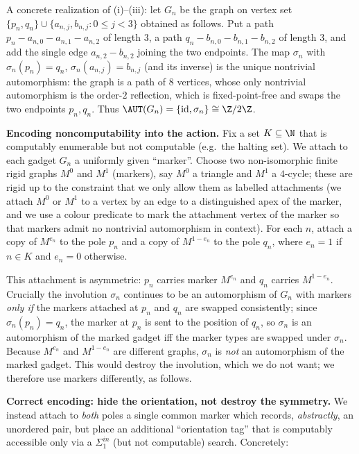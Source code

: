 A concrete realization of (i)--(iii): let $G_n$ be the graph on vertex set
$\{p_n,q_n\}\cup\{a_{n,j},b_{n,j}: 0\le j<3\}$ obtained as follows. Put a path
$p_n - a_{n,0} - a_{n,1} - a_{n,2}$ of length $3$, a path
$q_n - b_{n,0} - b_{n,1} - b_{n,2}$ of length $3$, and add the single edge
$a_{n,2}-b_{n,2}$ joining the two endpoints. The map $\sigma_n$ with
$\sigma_n(p_n)=q_n$, $\sigma_n(a_{n,j})=b_{n,j}$ (and its inverse) is the unique
nontrivial automorphism: the graph is a path of $8$ vertices, whose only nontrivial
automorphism is the order-$2$ reflection, which is fixed-point-free and swaps the
two endpoints $p_n,q_n$. Thus $\AUT(G_n)=\{\mathrm{id},\sigma_n\}\cong\Z/2\Z$.

\medskip

\noindent\textbf{Encoding noncomputability into the action.}
Fix a set $K\subseteq\N$ that is computably enumerable but not computable (e.g.\ the
halting set). We attach to each gadget $G_n$ a uniformly given ``marker''. Choose
two non-isomorphic finite rigid graphs $M^0$ and $M^1$ (markers), say $M^0$ a
triangle and $M^1$ a $4$-cycle; these are rigid up to the constraint that we only
allow them as labelled attachments (we attach $M^0$ or $M^1$ to a vertex by an edge
to a distinguished apex of the marker, and we use a colour predicate to mark the
attachment vertex of the marker so that markers admit no nontrivial automorphism
in context). For each $n$, attach a copy of $M^{e_n}$ to the pole $p_n$ and a copy of
$M^{1-e_n}$ to the pole $q_n$, where $e_n=1$ if $n\in K$ and $e_n=0$ otherwise.

This attachment is asymmetric: $p_n$ carries marker $M^{e_n}$ and $q_n$ carries
$M^{1-e_n}$. Crucially the involution $\sigma_n$ continues to be an automorphism of
$G_n$ with markers \emph{only if} the markers attached at $p_n$ and $q_n$ are
swapped consistently; since $\sigma_n(p_n)=q_n$, the marker at $p_n$ is sent to the
position of $q_n$, so $\sigma_n$ is an automorphism of the marked gadget iff the
marker types are swapped under $\sigma_n$. Because $M^{e_n}$ and $M^{1-e_n}$ are
different graphs, $\sigma_n$ is \emph{not} an automorphism of the marked gadget.
This would destroy the involution, which we do not want; we therefore use markers
differently, as follows.

\medskip

\noindent\textbf{Correct encoding: hide the orientation, not destroy the symmetry.}
We instead attach to \emph{both} poles a single common marker which records,
\emph{abstractly}, an unordered pair, but place an additional ``orientation tag''
that is computably accessible only via a $\Sigma^{in}_1$ (but not computable)
search. Concretely:

